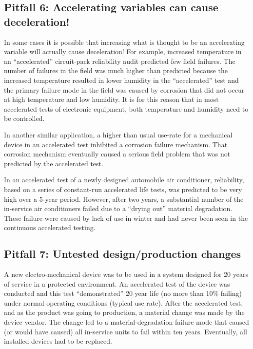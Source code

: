 \subsection{Pitfall 6: Accelerating variables can cause deceleration!}

In some cases it is possible that increasing what is thought to be
an accelerating variable will actually cause deceleration! For
example, increased temperature in an ``accelerated'' circuit-pack
reliability audit predicted few field failures. The number of 
failures in the field was much higher than predicted
because the increased temperature resulted in lower humidity in the
``accelerated'' test and the primary failure mode in the field was
caused by corrosion that did not occur at high temperature and low
humidity.  It is for this reason that in most accelerated tests of
electronic equipment, both temperature and humidity need to be
controlled.

In another similar application, a higher than usual use-rate for a
mechanical device in an accelerated test inhibited a corrosion failure
mechanism. That corrosion mechanism
eventually caused a serious field problem that was
not predicted by the accelerated test.

In an accelerated test of a newly designed automobile air
conditioner, reliability, based on a series of constant-run accelerated
life tests, was predicted to be very high over a 5-year
period. However, after two years, a substantial number of the
in-service air conditioners failed due to a ``drying out'' material
degradation. These failure were caused by lack of use in winter and
had never been seen in the continuous accelerated testing.

\subsection{Pitfall 7: Untested design/production changes}

A new electro-mechanical device was to be used in a system designed
for 20 years of service in a protected environment.  
An accelerated test of the device was conducted and this test
``demonstrated'' 20 year life (no more than 10\% failing) under
normal operating conditions (typical use rate).
After the accelerated test, and as the product was going to
production, a material change was made by the device vendor.
The change led to a material-degradation failure mode
that caused (or would have caused) all in-service units to fail
within ten years. Eventually, all installed devices had to be replaced.


